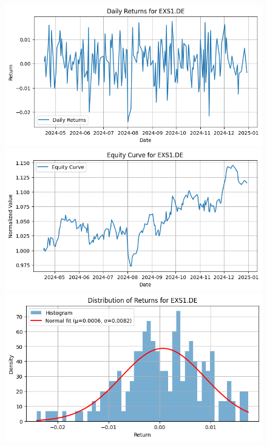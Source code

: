\documentclass{article}%
\begin{document}
\begin{figure}[htbp]%
\begin{minipage}{0.31\textwidth}%
\includegraphics[width=\linewidth]{ticker_images/EXS1.DE_daily_returns.png}%
\end{minipage}%
\begin{minipage}{0.31\textwidth}%
\includegraphics[width=\linewidth]{ticker_images/EXS1.DE_equity_curve.png}%
\end{minipage}%
\begin{minipage}{0.31\textwidth}%
\includegraphics[width=\linewidth]{ticker_images/EXS1.DE_return_distribution.png}%
\end{minipage}%
\end{figure}
\end{document}
